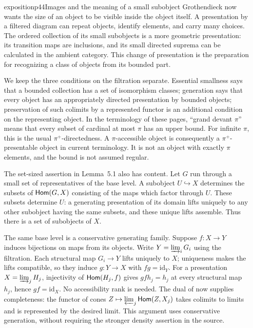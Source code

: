 \begin{dcomment}{exposition}{p44}{Images and the meaning of a small subobject}
Grothendieck now wants the size of an object to be visible inside the object itself. A presentation by a filtered diagram can repeat objects, identify elements, and carry many choices. The ordered collection of its small subobjects is a more geometric presentation: its transition maps are inclusions, and its small directed suprema can be calculated in the ambient category. This change of presentation is the preparation for recognizing a class of objects from its bounded part.

We keep the three conditions on the filtration separate. Essential smallness says that a bounded collection has a set of isomorphism classes; generation says that every object has an appropriately directed presentation by bounded objects; preservation of such colimits by a represented functor is an additional condition on the representing object. In the terminology of these pages, ``grand devant $\pi$'' means that every subset of cardinal at most $\pi$ has an upper bound. For infinite $\pi$, this is the usual $\pi^+$-directedness. A $\pi$-accessible object is consequently a $\pi^+$-presentable object in current terminology. It is not an object with exactly $\pi$ elements, and the bound is not assumed regular.

The set-sized assertion in Lemma~5.1 also has content. Let $G$ run through a small set of representatives of the base level. A subobject $U\hookrightarrow X$ determines the subsets of $\mathsf{Hom}(G,X)$ consisting of the maps which factor through $U$. These subsets determine $U$: a generating presentation of its domain lifts uniquely to any other subobject having the same subsets, and these unique lifts assemble. Thus there is a set of subobjects of $X$.

The same base level is a conservative generating family. Suppose $f:X\to Y$ induces bijections on maps from its objects. Write $Y=\varinjlim_iG_i$ using the filtration. Each structural map $G_i\to Y$ lifts uniquely to $X$; uniqueness makes the lifts compatible, so they induce $g:Y\to X$ with $fg=\mathrm{id}_Y$. For a presentation $X=\varinjlim_jH_j$, injectivity of $\mathsf{Hom}(H_j,f)$ gives $gf h_j=h_j$ at every structural map $h_j$, hence $gf=\mathrm{id}_X$. No accessibility rank is needed. The dual of \citep[Expos\'e~I, 8.12.7]{SGA4I1972} now supplies completeness: the functor of cones $Z\mapsto\varprojlim_j\mathsf{Hom}(Z,X_j)$ takes colimits to limits and is represented by the desired limit. This argument uses conservative generation, without requiring the stronger density assertion in the source.


\end{dcomment}
